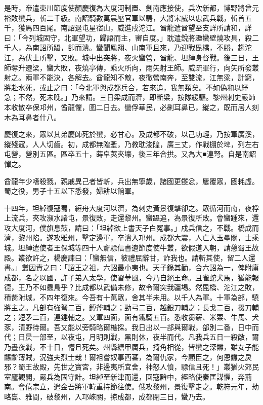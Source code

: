 \begin{pinyinscope}
 是時，帝遣東川節度使顏慶復為大度河制置、劍南應接使，兵次新都，博野將曾元裕敗蠻兵，斬二千級。南詔騎數萬晨壓官軍以騁，大將宋威以忠武兵戰，斬首五千，獲馬四百尾。南詔退屯星宿山，威進戍沱江。酋龍遣酋望至支詳所請和，詳曰：「今列城固守，北軍望功，歸語而主，審自度。」耽遣銳將趣蠻壁燒攻具，殺二千人，為南詔所躡，卻而潰。蠻聞鳳翔、山南軍且來，乃迎戰毘橋，不勝，趨沱江，為伏士所擊，又敗。城中出突將，夜火蠻營，酋龍、坦綽身督戰。後三日，王師奪升遷梁，蠻大敗，夜燒亭傳，乘火所向，雨矢射王師。威疏軍行，向矢所發叢射之。兩軍不能決，各解去。酋龍知不敵，夜徹營南奔，至雙流，江無梁，計窮，將赴水死，或止之曰：「今北軍與成都兵合，若來追，我無類矣。不如偽和以紓急；不然，死未晚。」乃來請。三日梁成而濟，即斷梁，按隊緩驅。黎州刺史嚴師本收散卒保邛州，酋龍懼，圍二日去。蠻俘華民，必劓耳鼻已，縱之，既而居人刻木為耳鼻者什八。



 慶復之來，眾以其弟慶師死於蠻，必甘心。及成都不破，以己功輕，乃按軍廣溪，縱殘寇，人人切齒。初，成都無隍塹，乃教耽浚隍，廣三丈，作戰棚於埤，列左右屯營，營別五區。區卒五十，蒔皁莢夾壕，後三年合拱。又為大■連弩。自是南詔憚之。



 酋龍年少嗜殺戮，親戚異己者皆斬，兵出無寧歲，諸國更讎忿，屢覆眾，國耗虛。蜀之役，男子十五以下悉發，婦耕以餉軍。



 十四年，坦綽復寇蜀，絙舟大度河以濟，為刺史黃景復擊卻之。眾循河而南，夜桴上流兵，夾攻瀕水諸屯，景復敗，走還黎州。蠻躡追，為景復所敗。會蠻踵來，還攻大度河，僕旗息鼓，請曰：「坦綽欲上書天子白冤事。」戍兵信之，不戰。橋成而濟，黎州陷。遂攻雅州，擊定邊軍，卒潰入邛州。成都大震，人亡入玉壘關，士乘城。坦綽遣使者王保城等四十人齎驃信書遺節度使牛叢，欲假道入朝，請憩蜀王故殿。叢欲許之，楊慶諫曰：「蠻無信，彼禮屈辭甘，詐我也。請斬其使，留二人還書。」叢因責之曰：「詔王之祖，六詔最小夷也。天子錄其勤，合六詔為一，俾附庸成都，名之以國，許子弟入太學，使習華風，今乃自絕王命。且雀蛇犬馬，猶能報德，王乃不如蟲鳥乎？比成都以武備未修，故令爾突我疆埸。然毘橋、沱江之敗，積胔附城，不四年復來。今吾有十萬眾，舍其半未用。以千人為軍。十軍為部，驍將主之。凡部有強弩二百，鎛斧輔之；勁弓二百，越銀刀輔之；長戈二百，掇刀輔之；短矛二百，連錘輔之。又軍四面，面有鐵騎五百。悉收芻薪、米粟、牛馬、犬豕，清野待爾。吾又能以旁騎略爾樵採。我日出以一部與爾戰，部別二番，日中而代；日昃一部至，以夜屯，月明則戰，黑則休，夜半而代。凡我兵五日一殺敵，爾乃晝夜戰，不十日，懵且死矣。州縣繕甲厲兵，掎角相從，皆蠻之深讎，雖女子能齽齘薄賊，況強夫烈士哉！爾祖嘗奴事西蕃，為爾仇家，今顧臣之，何恩讎之戾邪？蜀王故殿，先世之寶宮，非邊夷所宜舍，神怒人憤，驃信且死！」叢猶火郊民室廬觀閣，嚴兵為固守計。坦綽至新津而還，回寇黔中，經略使秦匡謀懼，奔荊南。會僖宗立，遣金吾將軍韓重持節往使。俄攻黎州，景復擊走之。乾符元年，劫略巂、雅間，破黎州，入邛崍關，掠成都，成都閉三日，蠻乃去。




\end{pinyinscope}
